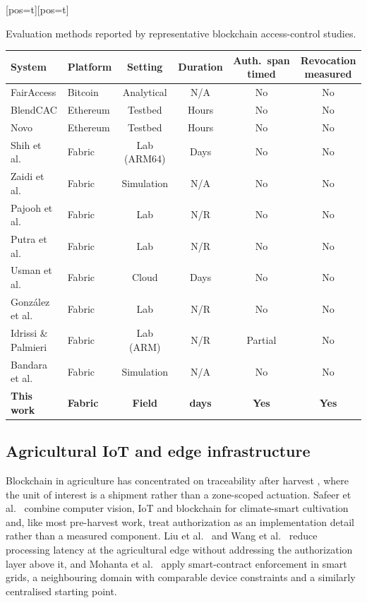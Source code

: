 \documentclass[a4paper,fleqn]{cas-sc}
\makeatletter
\newenvironment{widetab}[1][pos=t]
  {\ifdoublecol \@nameuse{table*}[#1]\else \@nameuse{table}[#1]\fi}
  {\ifdoublecol \@nameuse{endtable*}\else \@nameuse{endtable}\fi}
\makeatother
\begin{document}
\begin{widetab}
\caption{Evaluation methods reported by representative blockchain access-control studies.}
\label{tab:related}
\small
\begin{tabularx}{\linewidth}{@{}l l c c c C@{}}
\toprule
System & Platform & Setting & Duration & Auth.\ span timed & Revocation measured \\
\midrule
FairAccess \cite{ouaddah2016fairaccess}   & Bitcoin  & Analytical & N/A   & No & No \\
BlendCAC \cite{xu2018blendcac}            & Ethereum & Testbed    & Hours & No & No \\
Novo \cite{novo2018blockchain}            & Ethereum & Testbed    & Hours & No & No \\
Shih et al.\ \cite{shih2022iiot}          & Fabric   & Lab (ARM64)& Days  & No & No \\
Zaidi et al.\ \cite{zaidi2023fabrication} & Fabric   & Simulation & N/A   & No & No \\
Pajooh et al.\ \cite{pajooh2022fabric_iot}& Fabric   & Lab        & N/R   & No & No \\
Putra et al.\ \cite{putra2021trust}       & Fabric   & Lab        & N/R   & No & No \\
Usman et al.\ \cite{usman2024blockchain}  & Fabric   & Cloud      & Days  & No & No \\
Gonz\'{a}lez et al.\ \cite{gonzalez2023marketplace} & Fabric & Lab & N/R & No & No \\
Idrissi \& Palmieri \cite{idrissi2024blockchain_jsupercomput}
                                          & Fabric   & Lab (ARM)  & N/R   & Partial & No \\
Bandara et al.\ \cite{bandara2021modeling}& Fabric   & Simulation & N/A   & No & No \\
\textbf{This work}                        & \textbf{Fabric} &
  \textbf{Field} & \textbf{\DeployDays{} days} & \textbf{Yes} & \textbf{Yes} \\
\bottomrule
\end{tabularx}
\end{widetab}

\subsection{Agricultural IoT and edge infrastructure}
\label{subsec:rw_agri}

Blockchain in agriculture has concentrated on traceability after harvest
\cite{tian2017traceability,lin2018blockchain,bandara2021modeling}, where the
unit of interest is a shipment rather than a zone-scoped actuation. Safeer et
al.\ \cite{safeer2025agrifarming} combine computer vision, IoT and blockchain
for climate-smart cultivation and, like most pre-harvest work, treat
authorization as an implementation detail rather than a measured component.
Liu et al.\ \cite{liu2019edge} and Wang et al.\ \cite{wang2021edge} reduce
processing latency at the agricultural edge without addressing the
authorization layer above it, and Mohanta et al.\ \cite{mohanta2025smartgrid}
apply smart-contract enforcement in smart grids, a neighbouring domain with
comparable device constraints and a similarly centralised starting point.
\end{document}
